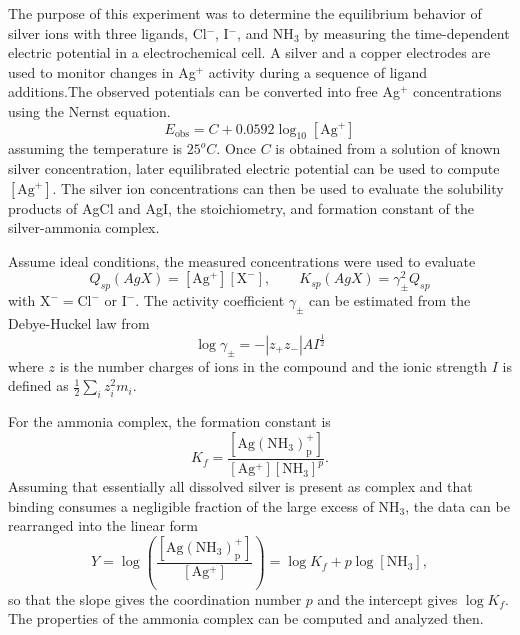 \documentclass[12pt]{article}
\begin{document}
The purpose of this experiment was to determine the equilibrium behavior of silver ions with three ligands, Cl$^-$, I$^-$, and NH$_3$ by measuring the time-dependent electric potential in a electrochemical cell. A silver and a copper electrodes are used to monitor changes in Ag$^+$ activity during a sequence of ligand additions.The observed potentials can be converted into free Ag$^+$ concentrations using the Nernst equation. \cite{lab_manual}
\begin{equation}
E_{\mathrm{obs}} = C + 0.0592\log_{10}[\mathrm{Ag^+}]
\label{eq:nernst}
\end{equation}
assuming the temperature is $25 ^oC$. Once $C$ is obtained from a solution of known silver concentration, later equilibrated electric potential can be used to compute $[\mathrm{Ag^+}]$. The silver ion concentrations can then be used to evaluate the solubility products of AgCl and AgI, the stoichiometry, and formation constant of the silver-ammonia complex.

Assume ideal conditions, the measured concentrations were used to evaluate\cite{lab_manual}
\begin{equation}
Q_{sp}(AgX)=[\mathrm{Ag^+}][\mathrm{X^-}], \qquad K_{sp}(AgX)=\gamma_{\pm}^{2}Q_{sp}
\end{equation}
with $\mathrm{X^-}=\mathrm{Cl^-}$ or $\mathrm{I^-}$. The activity coefficient $\gamma_{\pm}$ can be estimated from the Debye-Huckel law from\cite{lab_manual}
\begin{equation}
\log\gamma_{\pm}=-|z_+z_-|AI^{\frac{1}{2}}
\end{equation}
where $z$ is the number charges of ions in the compound and the ionic strength $I$ is defined as $\frac{1}{2}\sum_iz_i^2m_i$.

For the ammonia complex, the formation constant is\cite{lab_manual}
\begin{equation}
K_f = \frac{[\mathrm{Ag(NH_3)_p^+}]}{[\mathrm{Ag^+}][\mathrm{NH_3}]^{p}}.
\end{equation}
Assuming that essentially all dissolved silver is present as complex and that binding consumes a negligible fraction of the large excess of NH$_3$, the data can be rearranged into the linear form\cite{lab_manual}
\begin{equation}
Y = \log\left(\frac{[\mathrm{Ag(NH_3)_p^+}]}{[\mathrm{Ag^+}]}\right)=\log K_f+p\log[\mathrm{NH_3}],
\label{eq:fit}
\end{equation}
so that the slope gives the coordination number $p$ and the intercept gives $\log K_f$. The properties of the ammonia complex can be computed and analyzed then. 
\end{document}
